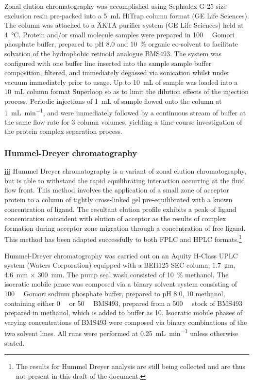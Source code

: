 \begin{refsection}
Zonal elution chromatography was accomplished using Sephadex G-25 size-exclusion
resin pre-packed into a \SI{5}{\mL} HiTrap column format (GE Life Sciences). The
column was attached to a \"{A}KTA purifier system (GE Life Sciences) held at
\SI{4}{\celsius}. Protein and/or small molecule samples were prepared in
\SI{100}{\milli\moLar} Gomori phosphate buffer, prepared to pH 8.0 and
\SI{10}{\percent} organic co-solvent to facilitate solvation of the hydrophobic
retinoid analogue BMS493. The system was configured with one buffer line inserted into
the sample sample buffer composition, filtered, and immediately degassed via
sonication whilst under vacuum immediately prior to usage. Up to \SI{10}{\mL} of
sample was loaded into a \SI{10}{\mL} column format Superloop so as to limit the
dilution effects of the injection process. Periodic injections of \SI{1}{\mL} of
sample flowed onto the column at \SI{1}{\mL\per\minute}, and were immediately
followed by a continuous stream of buffer at the same flow rate for 3 column
volumes, yielding a time-course investigation of the protein
complex separation process.

\subsubsection{Hummel-Dreyer chromatography} jjj Hummel Dreyer chromatography is
a variant of zonal elution chromatography, but is able to withstand the rapid
equilibrating interaction occurring at the fluid flow front. This method
involves the application of a small zone of acceptor protein to a column of
tightly cross-linked gel pre-equilibrated with a known concentration of
ligand.\cite{Hummel1962} The resultant elution profile exhibits a peak of ligand
concentration coincident with elution of acceptor as the results of complex
formation during acceptor zone migration through a concentration of free ligand.
This method has been adapted successfully to both FPLC and HPLC
formats.\cite{Bieri1998}\footnote{The results for Hummel Dreyer analysis are
still being collected and are thus not present in this draft of the document.}

Hummel-Dreyer chromatography was carried out on an Aquity H-Class UPLC system
(Waters Corporation) equipped with a BEH125 SEC column, \SI{1.7}{\um},
\SI{4.6}{\mm} ${\times}$ \SI{300}{\mm}. The pump seal wash consisted of
\SI{10}{\percent} methanol. The isocratic mobile phase was composed via a
binary solvent system consisting of \SI{100}{\milli\moLar} Gomori sodium
phosphate buffer, prepared to pH 8.0, \SI{10}{\volper} methanol, containing
either \SI{0}{\micro\moLar} or \SI{50}{\micro\moLar} BMS493, prepared from a
\SI{500}{\micro\moLar} stock of BMS493 prepared in methanol, which is added to
buffer as \SI{10}{\volper}. Isocratic mobile phases of varying concentrations of
BMS493 were composed via binary combinations of the two solvent lines. All runs
were performed at \SI{0.25}{\mL\per\minute} unless otherwise stated.


\end{refsection}
